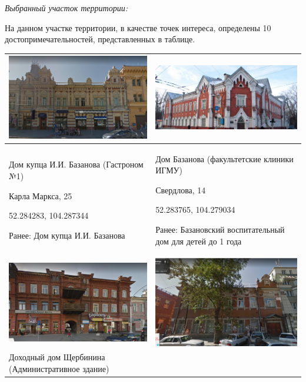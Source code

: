 \solutionSection

\textit{Выбранный участок территории:}


На данном участке территории, в качестве точек интереса, определены 10 достопримечательностей, представленных в таблице.

\begin{supertabular}[c]{@{}|p{8cm}|p{8cm}|@{}}
    \hline
    \includegraphics[width=6.5cm]{2} & \includegraphics[width=8cm]{3} \\
    \hline
    Дом купца И.И. Базанова  (Гастроном №1)

    Карла Маркса, 25 
    
    52.284283, 104.287344
    
    Ранее: Дом купца И.И. Базанова & Дом Базанова (факультетские клиники ИГМУ) 

    Свердлова, 14 

    52.283765, 104.279034

    Ранее: Базановский воспитательный дом для детей до 1 года \\
    \hline
    \includegraphics[width=7cm]{4} & \includegraphics[width=6.5cm]{5} \\
    \hline
    Доходный дом Щербинина (Административное здание)


\end{supertabular}
